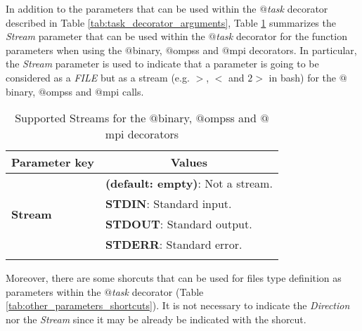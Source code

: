 In addition to the parameters that can be used within the {\it $@$task} decorator described in Table \ref{tab:task_decorator_arguments},
Table \ref{tab:other_parameters} summarizes the {\it Stream} parameter that can be used within the {\it $@$task} decorator for the function 
parameters when using the $@$binary, $@$ompss and $@$mpi decorators. In particular, the {\it Stream} parameter is used to indicate that a 
parameter is going to be considered as a {\it FILE} but as a stream (e.g. $>$, $<$ and $2>$  in bash) for the $@$binary, $@$ompss and $@$mpi calls.

\bgroup
  \def\arraystretch{1.5}%
  \begin{longtable}{| p{} | p{} |}
    \hline
    \multicolumn{1}{|c|}{{\bf Parameter key}} &  \multicolumn{1}{c|}{{\bf Values }}\\
    \hline
        \multirow{4}{*}{{\bf Stream}} & {\bf (default: empty)}: Not a stream. \\
                                      & {\bf STDIN}: Standard input. \\
                                      & {\bf STDOUT}: Standard output. \\
                                      & {\bf STDERR}: Standard error. \\
    \hline
     \caption{Supported Streams for the $@$binary, $@$ompss and $@$mpi decorators}
    \label{tab:other_parameters}
  \end{longtable}
\egroup

\vspace{-0.4cm}

Moreover, there are some shorcuts that can be used for files type definition as parameters within the {\it $@$task} decorator (Table \ref{tab:other_parameters_shortcuts}).
It is not necessary to indicate the {\it Direction} nor the {\it Stream} since it may be already be indicated with the shorcut.

